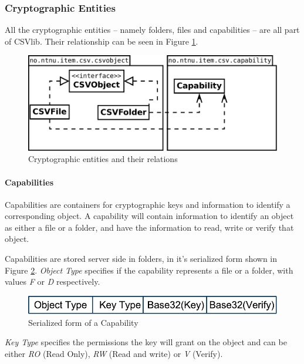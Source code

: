 \documentclass[pdftex,english,10pt,b5paper,twoside]{book}
\begin{document}
\subsubsection{Cryptographic Entities}
All the cryptographic entities -- namely folders, files and capabilities -- are all
part of CSVlib. Their relationship can be seen in Figure \ref{fig:CSVlib:overview}.

\begin{figure}[h!]
    \centering
    \includegraphics[scale=0.4]{csvobjects.pdf}
    \caption{Cryptographic entities and their relations}
    \label{fig:CSVlib:overview}
\end{figure}

\paragraph{Capabilities} Capabilities are containers for
cryptographic keys and information to identify a corresponding object. A
capability will contain information to identify an object as either a file or a
folder, and have the information to read, write or verify that object.

Capabilities are stored server side in folders, in it's serialized form shown
in Figure \ref{fig:CAP:serial}. \emph{Object Type} specifies if the capability
represents a file or a folder, with values \emph{F} or \emph{D} 
respectively.

\begin{figure}[h!]
    \centering
    \includegraphics[scale=0.6]{CapabilitySerialization.pdf}
    \caption{Serialized form of a Capability}
    \label{fig:CAP:serial}
\end{figure}

\emph{Key Type} specifies the permissions the key will grant on the object and
can be either \emph{RO} (Read Only), \emph{RW} (Read and write) or \emph{V}
(Verify).
\end{document}
